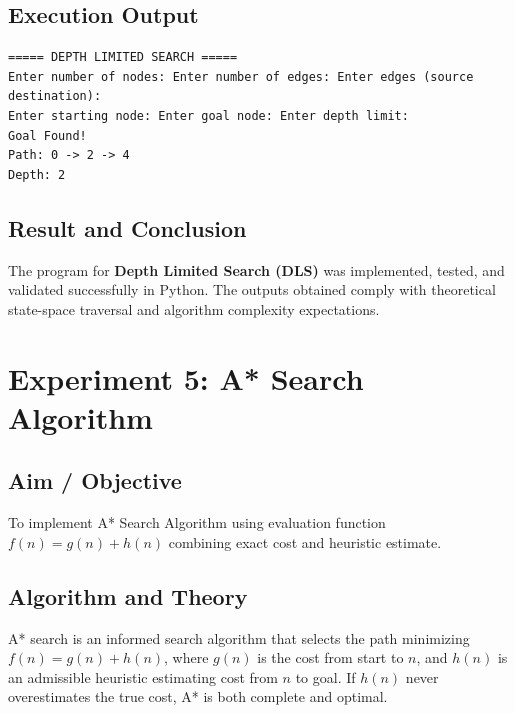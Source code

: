 \documentclass[11pt,a4paper]{report}
\begin{document}
\section{Execution Output}
\begin{tcolorbox}[colback=outputback,colframe=outputframe,title={\textbf{Terminal Output - Depth Limited Search (DLS)}}]
\begin{verbatim}
===== DEPTH LIMITED SEARCH =====
Enter number of nodes: Enter number of edges: Enter edges (source destination):
Enter starting node: Enter goal node: Enter depth limit: 
Goal Found!
Path: 0 -> 2 -> 4
Depth: 2
\end{verbatim}
\end{tcolorbox}

\section{Result and Conclusion}
The program for \textbf{Depth Limited Search (DLS)} was implemented, tested, and validated successfully in Python. The outputs obtained comply with theoretical state-space traversal and algorithm complexity expectations.

\newpage

\chapter{Experiment 5: A* Search Algorithm}

\section{Aim / Objective}
To implement A* Search Algorithm using evaluation function $f(n) = g(n) + h(n)$ combining exact cost and heuristic estimate.

\section{Algorithm and Theory}
A* search is an informed search algorithm that selects the path minimizing $f(n) = g(n) + h(n)$, where $g(n)$ is the cost from start to $n$, and $h(n)$ is an admissible heuristic estimating cost from $n$ to goal. If $h(n)$ never overestimates the true cost, A* is both complete and optimal.
\end{document}
